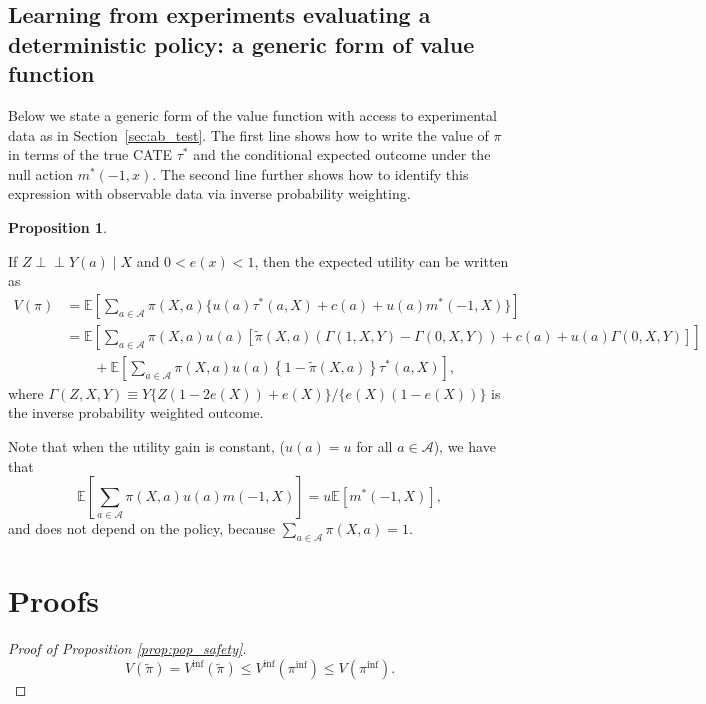 \documentclass[12pt]{article}
\theoremstyle{definition}
\newtheorem{proposition}{Proposition}
\newcommand{\E}{\ensuremath{\mathbb{E}}}
\newcommand{\<}{\langle}
\renewcommand{\>}{\rangle}
\begin{document}
\subsection{Learning from experiments evaluating a deterministic
  policy: a generic form of value function}

Below we state a generic form of the value function with access to
experimental data as in Section~\ref{sec:ab_test}. The first line
shows how to write the value of $\pi$ in terms of the true CATE
$\tau^\ast$ and the conditional expected outcome under the null action
$m^\ast(-1, x)$.  The second line further shows how to identify this
expression with observable data via inverse probability weighting.
\begin{proposition}
  \label{prop:ab_test_utility}

  If $Z \perp \!\! \perp Y(a) \mid X$ and $0 < e(x) < 1$, then the expected utility can be written as
  \begin{align*}
    V(\pi) &= \E\left[\sum_{a \in
    \mathcal{A}} \pi(X, a) \{u(a) \tau^\ast(a, X) + c(a) + u(a) m^\ast(-1, X)\}\right]\\
    & = \E\left[\sum_{a \in \mathcal{A}} \pi(X, a) 
      u(a) \left[\tilde{\pi}(X, a) \left(\Gamma(1,X,Y) - \Gamma(0, X, Y)\right) +  c(a) +  u(a) \Gamma(0, X, Y)\right]\right]\\
      & \qquad +  \E\left[\sum_{a \in \mathcal{A}} \pi(X, a) u(a)\left\{1 - \tilde{\pi}(X,a)\right\}
       \tau^\ast(a, X)\right] ,
  \end{align*}
  where $\Gamma(Z, X, Y) \equiv Y\{Z(1-2e(X)) + e(X)\}/\{e(X)(1 - e(X))\}$ is 
  the inverse probability weighted outcome.
\end{proposition}
Note that when the utility gain is constant, ($u(a) = u$ for all $a \in \mathcal{A}$),
we have that
\[
  \E\left[\sum_{a \in \mathcal{A}} \pi(X, a) u(a) m(-1, X)\right] = u\E[m^\ast(-1, X)],
\]
and does not depend on the policy, because $\sum_{a \in \mathcal{A}} \pi(X, a) = 1$.



\section{Proofs}

\begin{proof}[Proof of Proposition \ref{prop:pop_safety}]
  \[
  V(\tilde{\pi}) = V^{\inf}(\tilde{\pi}) \leq V^{\inf}(\pi^{\inf}) \leq V(\pi^{\inf}).
\]
\end{proof}
\end{document}
